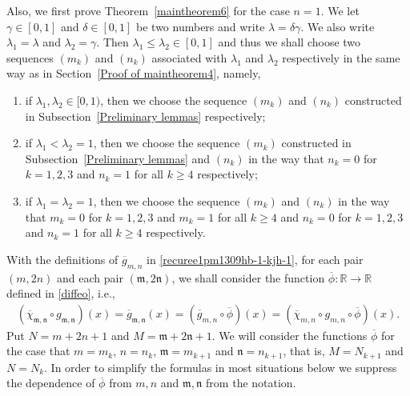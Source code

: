 \documentclass[12pt]{amsart}
\numberwithin{equation}{section}
\begin{document}
Also, we first prove Theorem~\ref{maintheorem6} for the case $n=1$. We let $\gamma\in[0,1]$ and $\delta\in[0,1]$ be two numbers and write $\lambda=\delta\gamma$. We also write $\lambda_1=\lambda$ and $\lambda_2=\gamma$. Then $\lambda_1\leq \lambda_2\in[0,1]$ and thus we shall choose two sequences $(m_k)$ and $(n_k)$ associated with $\lambda_1$ and $\lambda_2$ respectively in the same way as in Section~\ref{Proof of maintheorem4}, namely,
\begin{enumerate}
  \item [(I)] if $\lambda_1,\lambda_2\in[0,1)$, then we choose the sequence $(m_k)$ and $(n_k)$ constructed in Subsection~\ref{Preliminary lemmas} respectively;
  \item [(II)] if $\lambda_1<\lambda_2=1$, then we choose the sequence $(m_k)$ constructed in Subsection~\ref{Preliminary lemmas} and $(n_k)$ in the way that $n_k=0$ for $k=1,2,3$ and $n_k=1$ for all $k\geq 4$ respectively;
  \item [(III)] if $\lambda_1=\lambda_2=1$, then we choose the sequence $(m_k)$ and $(n_k)$ in the way that $m_k=0$ for $k=1,2,3$ and $m_k=1$ for all $k\geq 4$ and $n_k=0$ for $k=1,2,3$ and $n_k=1$ for all $k\geq 4$ respectively.
\end{enumerate}
With the definitions of $\overline{g}_{m,n}$ in \eqref{recuree1pm1309hb-1-kjh-1}, for each pair $(m,2n)$ and each pair $(\mathfrak{m},2\mathfrak{n})$, we shall consider the function $\overline{\phi}:\mathbb{R}\to\mathbb{R}$ defined in \eqref{diffeo}, i.e.,
\begin{equation*}%
\begin{split}
(\overline{\chi}_{\mathfrak{m},\mathfrak{n}}\circ g_{\mathfrak{m},\mathfrak{n}})(x)=\overline{g}_{\mathfrak{m},\mathfrak{n}}(x)=(\overline{g}_{m,n}\circ\overline{\phi})(x)=(\overline{\chi}_{m,n}\circ g_{m,n}\circ\overline{\phi})(x).
\end{split}
\end{equation*}
Put $N=m+2n+1$ and $M=\mathfrak{m}+2\mathfrak{n}+1$. We will consider the functions $\overline{\phi}$ for the case that $m=m_k$, $n=n_k$, $\mathfrak{m}=m_{k+1}$ and $\mathfrak{n}=n_{k+1}$, that is, $M=N_{k+1}$ and $N=N_k$. In order to simplify the formulas in most situations below we suppress the dependence of $\overline{\phi}$ from $m,n$ and $\mathfrak{m},\mathfrak{n}$ from the notation.
\end{document}
